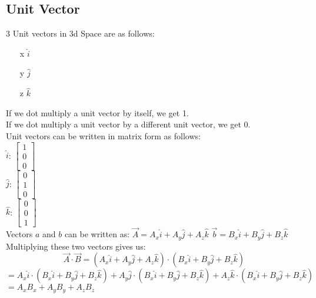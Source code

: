 \documentclass[]{article}
\begin{document}
\subsection*{Unit Vector}
3 Unit vectors in 3d Space are as follows:
\begin{itemize}
    \item[x] $\hat{i}$
    \item[y] $\hat{j}$
    \item[z] $\hat{k}$ 
\end{itemize}
If we dot multiply a unit vector by itself, we get 1.\\
If we dot multiply a unit vector by a different unit vector, we get 0.\\

Unit vectors can be written in matrix form as follows:\\
$\hat{i}$: $
    \begin{bmatrix}
        1 \\
        0 \\
        0
    \end{bmatrix}
$\\
$\hat{j}$: $
    \begin{bmatrix}
        0 \\
        1 \\
        0
    \end{bmatrix}
$\\
$\hat{k}$: $
    \begin{bmatrix}
        0 \\
        0 \\
        1
    \end{bmatrix}
$\\

Vectors $a$ and $b$ can be written as:
$\overrightarrow{A} = A_x\hat{i}+A_y\hat{j}+A_z\hat{k}$
$\overrightarrow{b} = B_x\hat{i}+B_y\hat{j}+B_z\hat{k}$
Multiplying these two vectors gives us:
\begin{equation*}
    \overrightarrow{A} \cdot \overrightarrow{B} = (A_x\hat{i}+A_y\hat{j}+A_z\hat{k}) \cdot (B_x\hat{i}+B_y\hat{j}+B_z\hat{k})
\end{equation*}
$=A_x\hat{i} \cdot (B_x\hat{i}+B_y\hat{j}+B_z\hat{k}) + A_y\hat{j} \cdot (B_x\hat{i}+B_y\hat{j}+B_z\hat{k}) + A_z\hat{k} \cdot (B_x\hat{i}+B_y\hat{j}+B_z\hat{k})$\\
$=A_xB_x + A_yB_y + A_zB_z$\\
\end{document}
